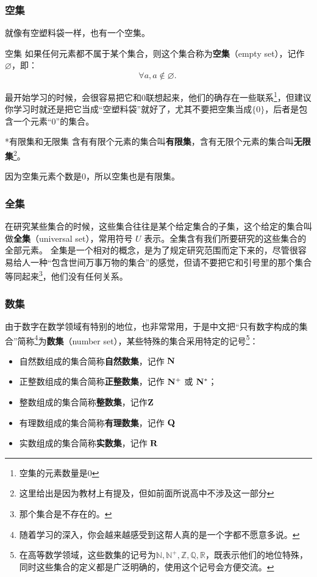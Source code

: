 \subsubsection{空集}

就像有空塑料袋一样，也有一个空集。

\begin{definition}{空集}
如果任何元素都不属于某个集合，则这个集合称为\textbf{空集}（empty set），记作 $\varnothing$，即：
\begin{equation}
\forall a,a\notin\varnothing.~
\end{equation}
\end{definition}

最开始学习的时候，会很容易把它和$0$联想起来，他们的确存在一些联系\footnote{空集的元素数量是0}，但建议你学习时就还是把它当成“空塑料袋”就好了，尤其不要把空集当成$\{0\}$，后者是包含一个元素“$0$”的集合。

\begin{definition}{*有限集和无限集}
含有有限个元素的集合叫\textbf{有限集}，含有无限个元素的集合叫\textbf{无限集}\footnote{这里给出是因为教材上有提及，但如前面所说高中不涉及这一部分}。
\end{definition}

因为空集元素个数是0，所以空集也是有限集。

\subsubsection{全集}

在研究某些集合的时候，这些集合往往是某个给定集合的子集，这个给定的集合叫做\textbf{全集}（universal set），常用符号 $U$ 表示。全集含有我们所要研究的这些集合的全部元素。
全集是一个相对的概念，是为了规定研究范围而定下来的，尽管很容易给人一种“包含世间万事万物的集合”的感觉，但请不要把它和引号里的那个集合等同起来\footnote{那个集合是不存在的。}，他们没有任何关系。

\subsubsection{数集}

由于数字在数学领域有特别的地位，也非常常用，于是中文把“只有数字构成的集合”简称\footnote{随着学习的深入，你会越来越感受到这帮人真的是一个字都不愿意多说。}为\textbf{数集}（number set），某些特殊的集合采用特定的记号\footnote{在高等数学领域，这些数集的记号为$\mathbb{N,N^+,Z,Q,R}$，既表示他们的地位特殊，同时这些集合的定义都是广泛明确的，使用这个记号会方便交流。}：
\begin{itemize}
\item 自然数组成的集合简称\textbf{自然数集}，记作 ${\rm \mathbf{N}}$
\item 正整数组成的集合简称\textbf{正整数集}，记作 ${\rm \mathbf{N^+}}$ 或 ${\rm \mathbf{N^*}}$； 
\item 整数组成的集合简称\textbf{整数集}，记作${\rm \mathbf{Z}}$
\item 有理数组成的集合简称\textbf{有理数集}，记作 ${\rm \mathbf{Q}}$
\item 实数组成的集合简称\textbf{实数集}，记作 ${\rm \mathbf{R}}$
\end{itemize}


